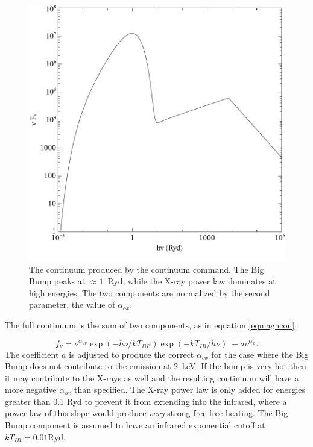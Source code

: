 \begin{figure}
\centering
\includegraphics[scale=0.75]{AGNCON}
\caption[AGN SED]{\label{fig:agncon}The continuum produced by the
 continuum command.
The Big Bump peaks at $\approx1$~Ryd,
while the X-ray power law dominates at high energies.
The two components are normalized by the second parameter, the value of
$\alpha_{ox}$.}
\end{figure}

The full continuum is the sum of two components,
as in equation \ref{eqn:agncon}:

\begin{equation}
\label{eqn:agncon}
f_\nu   = \nu ^{\alpha _{uv} } \exp \left( { - h\nu /kT_{BB} } \right)\exp
\left( { - kT_{IR} /h\nu } \right)\; + a\nu ^{\alpha _x }. %
\end{equation}
The coefficient $a$ is adjusted to produce the
correct $\alpha_{ox}$ for the case where
the Big Bump does not contribute to the emission at 2~keV.
If the bump
is very hot then it may contribute to the X-rays as well and
the resulting
continuum will have a more negative $\alpha_{ox}$ than specified.
The X-ray power
law is only added for energies greater than 0.1 Ryd to prevent
it from
extending into the infrared, where a power law of this slope
would produce
\emph{very} strong free-free heating.
The Big Bump component is assumed to have
an infrared exponential cutoff at $kT_{IR} = 0.01 \mathrm{Ryd}$.

